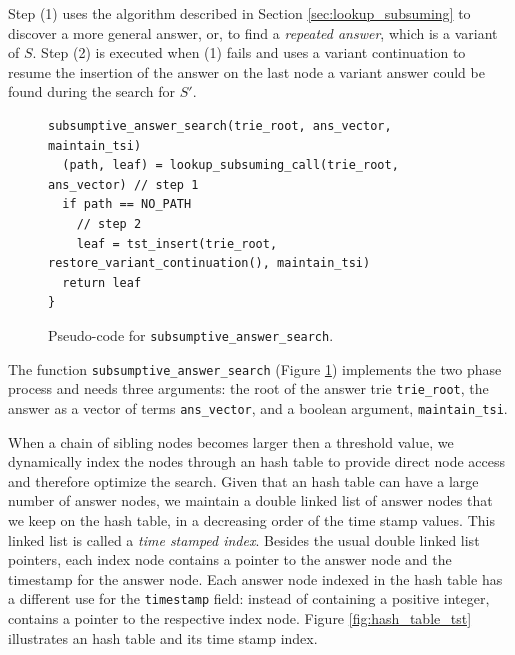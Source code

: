 Step (1) uses the algorithm described in Section \ref{sec:lookup_subsuming} to discover a more general answer, or,
to find a \textit{repeated answer}, which is a variant of $S$.
Step (2) is executed when (1) fails and uses a variant continuation to resume the insertion of the answer
on the last node a variant answer could be found during the search for $S'$.

\begin{figure}[ht]
\begin{Verbatim}
subsumptive_answer_search(trie_root, ans_vector, maintain_tsi)
  (path, leaf) = lookup_subsuming_call(trie_root, ans_vector) // step 1
  if path == NO_PATH
    // step 2
    leaf = tst_insert(trie_root, restore_variant_continuation(), maintain_tsi)
  return leaf
}
\end{Verbatim}
\caption{Pseudo-code for \texttt{subsumptive\_answer\_search}.}
\label{fig:subsumptive_answer_search}
\end{figure}

The function \texttt{subsumptive\_answer\_search} (Figure \ref{fig:subsumptive_answer_search})
implements the two phase process and needs three arguments: the root of the answer trie \texttt{trie\_root},
the answer as a vector of terms \texttt{ans\_vector}, and a boolean argument, \texttt{maintain\_tsi}.

When a chain of sibling nodes becomes larger then a threshold value, we dynamically index the nodes through an hash table to provide direct node access and therefore optimize the search. Given that an hash table
can have a large number of answer nodes, we maintain a double linked list of answer nodes that we keep on the hash
table, in a decreasing order of the time stamp values. This linked list is called a \textit{time stamped index}.
Besides the usual double linked list pointers, each index node contains a pointer to the answer node
and the timestamp for the answer node. Each answer node indexed in the hash table has a different use
for the \texttt{timestamp} field: instead of containing a positive integer, contains a pointer to the respective index node. Figure \ref{fig:hash_table_tst} illustrates an hash table and its time stamp index.

